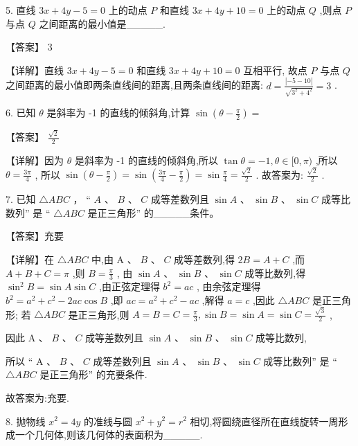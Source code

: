 \documentclass[10pt]{article}
\begin{document}
5. 直线 \({3x} + {4y} - 5 = 0\) 上的动点 \(P\) 和直线 \({3x} + {4y} + {10} = 0\) 上的动点 \(Q\) ,则点 \(P\) 与点 \(Q\) 之间距离的最小值是\_\_\_\_\_.

【答案】 3

【详解】直线 \({3x} + {4y} - 5 = 0\) 和直线 \({3x} + {4y} + {10} = 0\) 互相平行, 故点 \(P\) 与点 \(Q\) 之间距离的最小值即两条直线间的距离,且两条直线间的距离: \(d = \frac{\left| -5 - {10}\right| }{\sqrt{{3}^{2} + {4}^{2}}} = 3\) .

6. 已知 \(\theta\) 是斜率为 -1 的直线的倾斜角,计算 \(\sin \left( {\theta  - \frac{\pi }{2}}\right)  =\)

【答案】 \(\frac{\sqrt{2}}{2}\)

【详解】因为 \(\theta\) 是斜率为 -1 的直线的倾斜角,所以 \(\tan \theta  =  - 1,\theta  \in  \lbrack 0,\pi )\) ,所以 \(\theta  = \frac{3\pi }{4}\) , 所以 \(\sin \left( {\theta  - \frac{\pi }{2}}\right)  = \sin \left( {\frac{3\pi }{4} - \frac{\pi }{2}}\right)  = \sin \frac{\pi }{4} = \frac{\sqrt{2}}{2}\) . 故答案为: \(\frac{\sqrt{2}}{2}\) .

7. 已知 \(\bigtriangleup {ABC}\) ， “ \(A\) 、 \(B\) 、 \(C\) 成等差数列且 \(\sin A\) 、 \(\sin B\) 、 \(\sin C\) 成等比数列” 是 “ \(\bigtriangleup {ABC}\) 是正三角形” 的\_\_\_\_\_条件。

【答案】充要

【详解】在 \(\bigtriangleup {ABC}\) 中,由 \(\mathrm{A}\text{ 、 }B\text{ 、 }C\) 成等差数列,得 \({2B} = A + C\) ,而 \(A + B + C = \pi\) ,则 \(B = \frac{\pi }{3}\) , 由 \(\sin A\text{ 、 }\sin B\text{ 、 }\sin C\) 成等比数列,得 \({\sin }^{2}B = \sin A\sin C\) ,由正弦定理得 \({b}^{2} = {ac}\) , 由余弦定理得 \({b}^{2} = {a}^{2} + {c}^{2} - {2ac}\cos B\) ,即 \({ac} = {a}^{2} + {c}^{2} - {ac}\) ,解得 \(a = c\) ,因此 \(\bigtriangleup {ABC}\) 是正三角形; 若 \(\bigtriangleup {ABC}\) 是正三角形,则 \(A = B = C = \frac{\pi }{3},\sin B = \sin A = \sin C = \frac{\sqrt{3}}{2}\) ,

因此 \(\mathrm{A}\text{ 、 }B\text{ 、 }C\) 成等差数列且 \(\sin A\text{ 、 }\sin B\text{ 、 }\sin C\) 成等比数列,

所以 “ \(\mathrm{A}\text{ 、 }B\text{ 、 }C\) 成等差数列且 \(\sin A\text{ 、 }\sin B\text{ 、 }\sin C\) 成等比数列” 是 “ \(\bigtriangleup {ABC}\) 是正三角形” 的充要条件.

故答案为:充要.

8. 抛物线 \({x}^{2} = {4y}\) 的准线与圆 \({x}^{2} + {y}^{2} = {r}^{2}\) 相切,将圆绕直径所在直线旋转一周形成一个几何体,则该几何体的表面积为\_\_\_\_\_.
\end{document}
